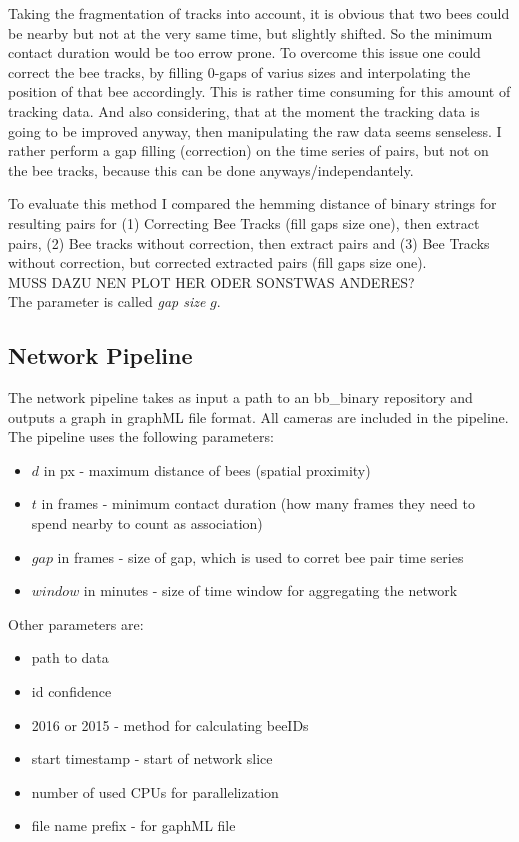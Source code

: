 Taking the fragmentation of tracks into account, it is obvious that two bees could be nearby but not at the very same time, but slightly shifted. So the minimum contact duration would be too errow prone. To overcome this issue one could correct the bee tracks, by filling 0-gaps of varius sizes and interpolating the position of that bee accordingly. This is rather time consuming for this amount of tracking data. And also considering, that at the moment the tracking data is going to be improved anyway, then manipulating the raw data seems senseless. I rather perform a gap filling (correction) on the time series of pairs, but not on the bee tracks, because this can be done anyways/independantely.


To evaluate this method I compared the hemming distance of binary strings for resulting pairs for (1) Correcting Bee Tracks (fill gaps size one), then extract pairs, (2) Bee tracks without correction, then extract pairs and (3) Bee Tracks without correction, but corrected extracted pairs (fill gaps size one).\\
MUSS DAZU NEN PLOT HER ODER SONSTWAS ANDERES?\\

The parameter is called \emph{gap size} $g$.

\subsection{Network Pipeline}

The network pipeline takes as input a path to an bb\_binary repository and outputs a graph in graphML file format. All cameras are included in the pipeline. The pipeline uses the following parameters:

\begin{itemize}
\item $d$ in px - maximum distance of bees (spatial proximity)
\item $t$ in frames - minimum contact duration (how many frames they need to spend nearby to count as association)
\item $gap$ in frames - size of gap, which is used to corret bee pair time series
\item $window$ in minutes - size of time window for aggregating the network
\end{itemize}

Other parameters are:

\begin{itemize}
\item path to data
\item id confidence
\item 2016 or 2015 - method for calculating beeIDs
\item start timestamp - start of network slice
\item number of used CPUs for parallelization
\item file name prefix - for gaphML file
\end{itemize}

